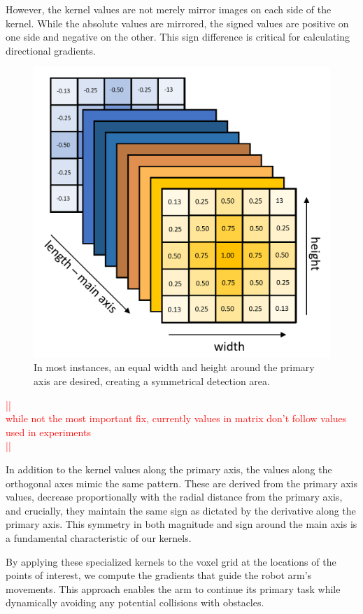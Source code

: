 \documentclass[a4paper]{article}
\newcommand\todocomment[1]{\textcolor{red}{||\\ #1\\||}}
\begin{document}
However, the kernel values are not merely mirror images on each side of the kernel. While the absolute values are mirrored, the signed values are positive on one side and negative on the other. This sign difference is critical for calculating directional gradients.

\begin{figure}[H]
	\centering
	\includegraphics[width=0.85\linewidth]{kernel-matrix.png}
	\caption{In most instances, an equal width and height around the primary axis are desired, creating a symmetrical detection area.} 
	\label{Kernel matrix}
\end{figure}

\todocomment{while not the most important fix, currently values in matrix don't follow values used in experiments}


In addition to the kernel values along the primary axis, the values along the orthogonal axes mimic the same pattern. These are derived from the primary axis values, decrease proportionally with the radial distance from the primary axis, and crucially, they maintain the same sign as dictated by the derivative along the primary axis. This symmetry in both magnitude and sign around the main axis is a fundamental characteristic of our kernels.

By applying these specialized kernels to the voxel grid at the locations of the points of interest, we compute the gradients that guide the robot arm's movements. This approach enables the arm to continue its primary task while dynamically avoiding any potential collisions with obstacles.
\end{document}
